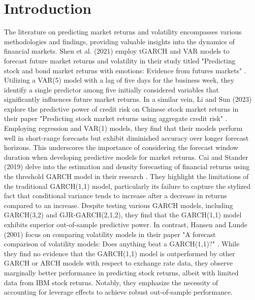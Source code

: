 \documentclass[a4paper,12pt]{article}
\begin{document}
\normalsize




\newpage





\section{Introduction}
\label{intro} \normalsize


The literature on predicting market returns and volatility encompasses various methodologies and findings, providing valuable insights into the dynamics of financial markets. Shen et al. (2021) employ tGARCH and VAR models to forecast future market returns and volatility in their study titled "Predicting stock and bond market returns with emotions: Evidence from futures markets" \parencite{Shen_Griffith_Najand_Sun_2021}. Utilizing a VAR(5) model with a lag of five days for the business week, they identify a single predictor among five initially considered variables that significantly influences future market returns. In a similar vein, Li and Sun (2023) explore the predictive power of credit risk on Chinese stock market returns in their paper "Predicting stock market returns using aggregate credit risk" \parencite{Li_Sun_2023}. Employing regression and VAR(1) models, they find that their models perform well in short-range forecasts but exhibit diminished accuracy over longer forecast horizons. This underscores the importance of considering the forecast window duration when developing predictive models for market returns. Cai and Stander (2019) delve into the estimation and density forecasting of financial returns using the threshold GARCH model in their research \parencite{Cai_Stander_2019}. They highlight the limitations of the traditional GARCH(1,1) model, particularly its failure to capture the stylized fact that conditional variance tends to increase after a decrease in returns compared to an increase. Despite testing various GARCH models, including GARCH(3,2) and GJR-GARCH(2,1,2), they find that the GARCH(1,1) model exhibits superior out-of-sample predictive power. In contrast, Hansen and Lunde (2001) focus on comparing volatility models in their paper "A forecast comparison of volatility models: Does anything beat a GARCH(1,1)?" \parencite{Hansen_Lunde_2001}. While they find no evidence that the GARCH(1,1) model is outperformed by other GARCH or ARCH models with respect to exchange rate data, they observe marginally better performance in predicting stock returns, albeit with limited data from IBM stock returns. Notably, they emphasize the necessity of accounting for leverage effects to achieve robust out-of-sample performance.
\end{document}
